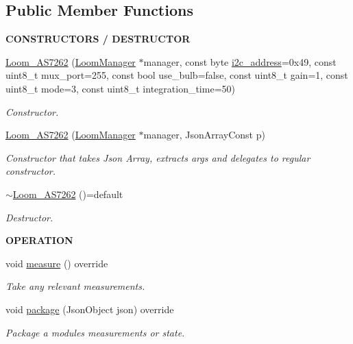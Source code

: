 \subsection*{Public Member Functions}
\begin{Indent}{\bf C\+O\+N\+S\+T\+R\+U\+C\+T\+O\+RS / D\+E\+S\+T\+R\+U\+C\+T\+OR}\par
\begin{DoxyCompactItemize}
\item 
\hyperlink{class_loom___a_s7262_aa2520f32d63b534ceffe3f4348966f2b}{Loom\+\_\+\+A\+S7262} (\hyperlink{class_loom_manager}{Loom\+Manager} $\ast$manager, const byte \hyperlink{class_loom_i2_c_sensor_a6ff389c1f015152a9ebfccb037d3d90e}{i2c\+\_\+address}=0x49, const uint8\+\_\+t mux\+\_\+port=255, const bool use\+\_\+bulb=false, const uint8\+\_\+t gain=1, const uint8\+\_\+t mode=3, const uint8\+\_\+t integration\+\_\+time=50)
\begin{DoxyCompactList}\small\item\em Constructor. \end{DoxyCompactList}\item 
\hyperlink{class_loom___a_s7262_a3b3bb211be2a318531600601d1a7ed33}{Loom\+\_\+\+A\+S7262} (\hyperlink{class_loom_manager}{Loom\+Manager} $\ast$manager, Json\+Array\+Const p)
\begin{DoxyCompactList}\small\item\em Constructor that takes Json Array, extracts args and delegates to regular constructor. \end{DoxyCompactList}\item 
\hyperlink{class_loom___a_s7262_a1b66df2745f0d55e23d934027039647c}{$\sim$\+Loom\+\_\+\+A\+S7262} ()=default
\begin{DoxyCompactList}\small\item\em Destructor. \end{DoxyCompactList}\end{DoxyCompactItemize}
\end{Indent}
\begin{Indent}{\bf O\+P\+E\+R\+A\+T\+I\+ON}\par
\begin{DoxyCompactItemize}
\item 
void \hyperlink{class_loom___a_s7262_a4aa32d83a2fbbaa9622d5b567742a1a5}{measure} () override
\begin{DoxyCompactList}\small\item\em Take any relevant measurements. \end{DoxyCompactList}\item 
void \hyperlink{class_loom___a_s7262_a943cf5569f3f583da3049d8d64e7da76}{package} (Json\+Object json) override
\begin{DoxyCompactList}\small\item\em Package a modules measurements or state. \end{DoxyCompactList}\end{DoxyCompactItemize}
\end{Indent}
